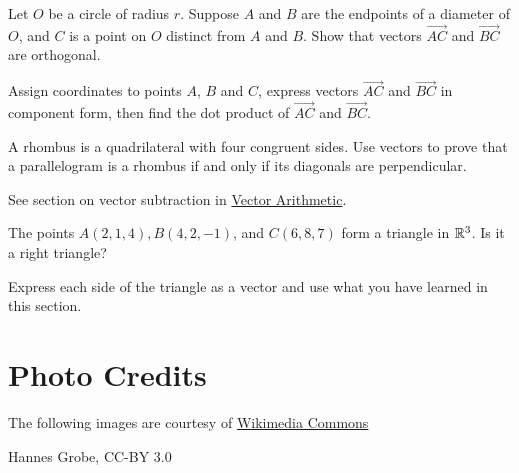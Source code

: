 \documentclass{ximera}
\begin{document}
\begin{problem} \label{prob:righttriangleincircle}
Let $O$ be a circle of radius $r$.  Suppose $A$ and $B$ are the endpoints of a diameter of $O$, and $C$ is a point on $O$ distinct from $A$ and $B$. Show that vectors $\overrightarrow{AC}$ and $\overrightarrow{BC}$ are orthogonal.  

\begin{hint}
Assign coordinates to points $A$, $B$ and $C$, express vectors $\overrightarrow{AC}$ and $\overrightarrow{BC}$ in component form, then find the dot product of $\overrightarrow{AC}$ and $\overrightarrow{BC}$.
\end{hint}

\begin{center}
\end{center}
\end{problem}

\begin{problem}\label{prob:rhombusdot} A rhombus is a quadrilateral with four congruent sides.  Use vectors to prove that a parallelogram is a rhombus if and only if its diagonals are perpendicular.
\begin{hint}
See section on vector subtraction in \href{\xmbaseurl/VEC-0030/main}{Vector Arithmetic}.
\end{hint}
\end{problem}

\begin{problem}\label{prob:pythagoreanR3usedotp}
 The points $A(2,1,4),B(4,2,-1)$, and $C(6,8,7)$ form a triangle in $\mathbb{R}^3$.  Is it a right triangle?
\begin{hint}
Express each side of the triangle as a vector and use what you have learned in this section.
\end{hint}
\end{problem}

\section*{Photo Credits}
The following images are courtesy of \href{https://commons.wikimedia.org/wiki/Main_Page}
{Wikimedia Commons}

\noindent Hannes Grobe,  CC-BY 3.0
\end{document}
